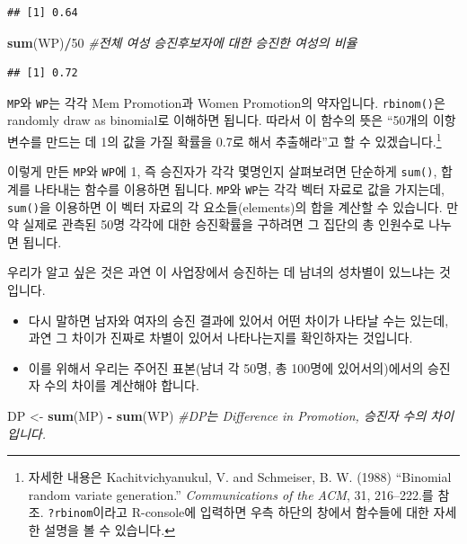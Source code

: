 \documentclass[]{book}
\newenvironment{Shaded}{\begin{snugshade}}{\end{snugshade}}
\newcommand{\CommentTok}[1]{\textcolor[rgb]{0.56,0.35,0.01}{\textit{#1}}}
\newcommand{\DecValTok}[1]{\textcolor[rgb]{0.00,0.00,0.81}{#1}}
\newcommand{\KeywordTok}[1]{\textcolor[rgb]{0.13,0.29,0.53}{\textbf{#1}}}
\newcommand{\NormalTok}[1]{#1}
\newcommand{\OperatorTok}[1]{\textcolor[rgb]{0.81,0.36,0.00}{\textbf{#1}}}
\newcommand{\StringTok}[1]{\textcolor[rgb]{0.31,0.60,0.02}{#1}}
\providecommand{\tightlist}{%
  \setlength{\itemsep}{0pt}\setlength{\parskip}{0pt}}
\let\rmarkdownfootnote\footnote%
\def\footnote{\protect\rmarkdownfootnote}
\begin{document}
\begin{itemize}
\begin{verbatim}
## [1] 0.64
\end{verbatim}

\begin{Shaded}
\begin{Highlighting}[]
\KeywordTok{sum}\NormalTok{(WP)}\OperatorTok{/}\DecValTok{50} \CommentTok{#전체 여성 승진후보자에 대한 승진한 여성의 비율}
\end{Highlighting}
\end{Shaded}

\begin{verbatim}
## [1] 0.72
\end{verbatim}
\end{itemize}

\texttt{MP}와 \texttt{WP}는 각각 Mem Promotion과 Women Promotion의 약자입니다. \texttt{rbinom()}은 randomly draw as binomial로 이해하면 됩니다. 따라서 이 함수의 뜻은 ``50개의 이항변수를 만드는 데 1의 값을 가질 확률을 0.7로 해서 추출해라''고 할 수 있겠습니다.\footnote{자세한 내용은 Kachitvichyanukul, V. and Schmeiser, B. W. (1988) ``Binomial random variate generation.'' \emph{Communications of the ACM}, 31, 216--222.를 참조. \texttt{?rbinom}이라고 R-console에 입력하면 우측 하단의 창에서 함수들에 대한 자세한 설명을 볼 수 있습니다.}

이렇게 만든 \texttt{MP}와 \texttt{WP}에 1, 즉 승진자가 각각 몇명인지 살펴보려면 단순하게 \texttt{sum()}, 합계를 나타내는 함수를 이용하면 됩니다. \texttt{MP}와 \texttt{WP}는 각각 벡터 자료로 값을 가지는데, \texttt{sum()}을 이용하면 이 벡터 자료의 각 요소들(elements)의 합을 계산할 수 있습니다. 만약 실제로 관측된 50명 각각에 대한 승진확률을 구하려면 그 집단의 총 인원수로 나누면 됩니다.

우리가 알고 싶은 것은 과연 이 사업장에서 승진하는 데 남녀의 성차별이 있느냐는 것입니다.

\begin{itemize}
\tightlist
\item
  다시 말하면 남자와 여자의 승진 결과에 있어서 어떤 차이가 나타날 수는 있는데, 과연 그 차이가 진짜로 차별이 있어서 나타나는지를 확인하자는 것입니다.
\item
  이를 위해서 우리는 주어진 표본(남녀 각 50명, 총 100명에 있어서의)에서의 승진자 수의 차이를 계산해야 합니다.
\end{itemize}

\begin{Shaded}
\begin{Highlighting}[]
\NormalTok{DP <-}\StringTok{ }\KeywordTok{sum}\NormalTok{(MP) }\OperatorTok{-}\StringTok{ }\KeywordTok{sum}\NormalTok{(WP) }\CommentTok{#DP는 Difference in Promotion, 승진자 수의 차이입니다.}
\end{Highlighting}
\end{Shaded}
\end{document}
